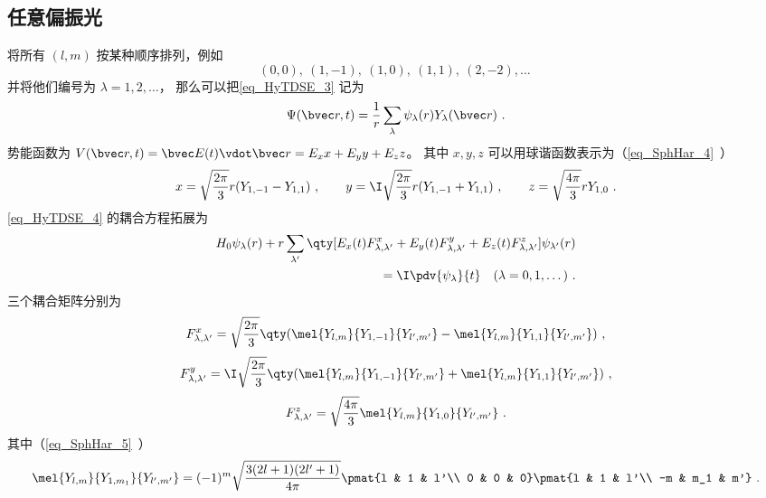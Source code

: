 \subsection{任意偏振光}
将所有 $(l,m)$ 按某种顺序排列，例如
\begin{equation}
(0, 0),\ (1,-1),\ (1,0),\ (1,1),\ (2,-2), \dots~
\end{equation}
并将他们编号为 $\lambda = 1,2, \dots$， 那么可以把\autoref{eq_HyTDSE_3} 记为
\begin{equation}
\Psi(\bvec r, t) = \frac{1}{r}\sum_\lambda \psi_\lambda(r) Y_\lambda(\bvec r)~.
\end{equation}
势能函数为 $V(\bvec r, t) = \bvec E(t) \vdot \bvec r  = E_x x + E_y y + E_z z$。 其中 $x,y,z$ 可以用球谐函数表示为（\autoref{eq_SphHar_4}~）
\begin{equation}
x = \sqrt{\frac{2\pi}{3}} r (Y_{1,-1} - Y_{1,1})~, \qquad
y = \I \sqrt{\frac{2\pi}{3}} r (Y_{1,-1}+Y_{1,1})~, \qquad
z = \sqrt{\frac{4\pi}{3}} rY_{1,0}~.
\end{equation}
\autoref{eq_HyTDSE_4} 的耦合方程拓展为
\begin{equation}
\begin{aligned}
H_0 \psi_{\lambda}(r) + r \sum_{\lambda'} \qty[E_x(t) F_{\lambda, \lambda'}^{x} + E_y(t) F_{\lambda, \lambda'}^{y} + E_z(t) F_{\lambda, \lambda'}^{z}] \psi_{\lambda'}(r) \\
= \I \pdv{\psi_{\lambda}}{t} \quad (\lambda=0,1,\dots)~.
\end{aligned}
\end{equation}
三个耦合矩阵分别为
\begin{equation}
\begin{aligned}
F_{\lambda,\lambda'}^{x} = \sqrt{\frac{2\pi}{3}} \qty(\mel{Y_{l,m}}{Y_{1,-1}}{Y_{l',m'}} - \mel{Y_{l,m}}{Y_{1,1}}{Y_{l',m'}})~,
\end{aligned}
\end{equation}
\begin{equation}
\begin{aligned}
F_{\lambda,\lambda'}^{y} = \I\sqrt{\frac{2\pi}{3}} \qty(\mel{Y_{l,m}}{Y_{1,-1}}{Y_{l',m'}} + \mel{Y_{l,m}}{Y_{1,1}}{Y_{l',m'}})~,
\end{aligned}
\end{equation}
\begin{equation}
\begin{aligned}
F_{\lambda,\lambda'}^{z} = \sqrt{\frac{4\pi}{3}} \mel{Y_{l,m}}{Y_{1,0}}{Y_{l',m'}}~.
\end{aligned}
\end{equation}
其中（\autoref{eq_SphHar_5}~）
\begin{equation}
\mel{Y_{l,m}}{Y_{1,m_1}}{Y_{l',m'}} = (-1)^m\sqrt{\frac{3(2l+1)(2l'+1)}{4\pi}} \pmat{l & 1 & l'\\ 0 & 0 & 0}\pmat{l & 1 & l'\\ -m & m_1 & m'}~.
\end{equation}

